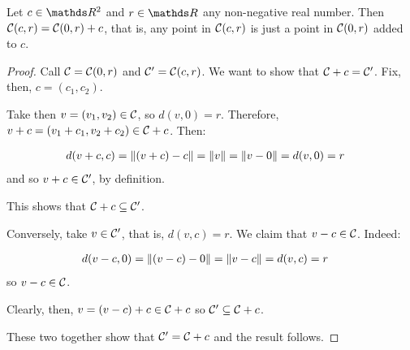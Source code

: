\begin{lemma}
	Let $c\in \R^2$ and $r\in \R$ any non-negative real number. Then $\mathcal C(c,r)=\mathcal C(0,r)+c$, that is, any point in $\mathcal C(c,r)$ is just a point in $\mathcal C(0,r)$ added to $c$.
\end{lemma}
\begin{proof}
	Call $\mathcal C=\mathcal C(0,r)$ and $\mathcal C'= \mathcal C(c,r)$. We want to show that $\mathcal C+c=\mathcal C'$. Fix, then, $c=(c_1,c_2)$.
	
	Take then $v=(v_1,v_2)\in \mathcal C$, so $d(v,0)=r$. Therefore, $v+c=(v_1+c_1,v_2+c_2)\in \mathcal C+c$. Then:
	
	\begin{align*}
		d(v+c,c)&=\lVert(v+c)-c\rVert=\lVert v\rVert=\lVert v-0\rVert=d(v,0)=r
	\end{align*}and so $v+c\in \mathcal C'$, by definition.
	
	This shows that $\mathcal C+c\subseteq \mathcal C'$.
	
	\bigskip
	Conversely, take $v\in \mathcal C'$, that is, $d(v,c)=r$. We claim that $v-c\in \mathcal C$. Indeed:
	
	\begin{align*}
		d(v-c,0)&=\lVert(v-c)-0\rVert=\lVert v-c\rVert=d(v,c)=r
	\end{align*}so $v-c\in \mathcal C$.
	
	Clearly, then, $v=(v-c)+c\in \mathcal C+c$ so $\mathcal C'\subseteq \mathcal C+c$.
	
	These two together show that $\mathcal C'=\mathcal C+c$ and the result follows.
\end{proof}

